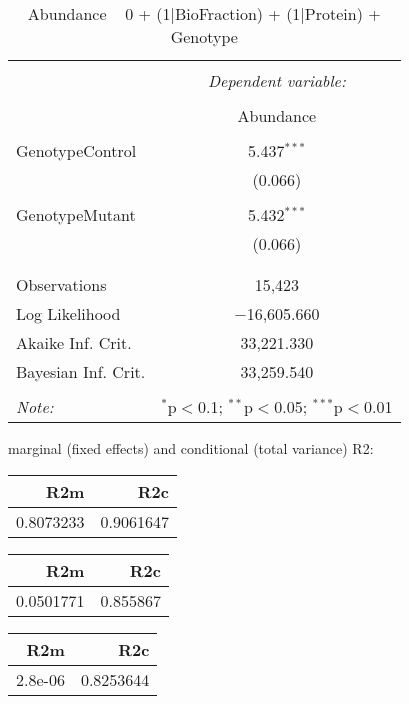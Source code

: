\documentclass[11pt]{report}
\begin{document}
\begin{table}[!htbp] \centering 
  \caption{Abundance ~ 0 + (1|BioFraction) + (1|Protein) + Genotype} 
  \label{} 
\begin{tabular}{@{\extracolsep{5pt}}lc} 
\\[-1.8ex]\hline 
\hline \\[-1.8ex] 
 & \multicolumn{1}{c}{\textit{Dependent variable:}} \\ 
\cline{2-2} 
\\[-1.8ex] & Abundance \\ 
\hline \\[-1.8ex] 
 GenotypeControl & 5.437$^{***}$ \\ 
  & (0.066) \\ 
  & \\ 
 GenotypeMutant & 5.432$^{***}$ \\ 
  & (0.066) \\ 
  & \\ 
\hline \\[-1.8ex] 
Observations & 15,423 \\ 
Log Likelihood & $-$16,605.660 \\ 
Akaike Inf. Crit. & 33,221.330 \\ 
Bayesian Inf. Crit. & 33,259.540 \\ 
\hline 
\hline \\[-1.8ex] 
\textit{Note:}  & \multicolumn{1}{r}{$^{*}$p$<$0.1; $^{**}$p$<$0.05; $^{***}$p$<$0.01} \\ 
\end{tabular} 
\end{table} 
marginal (fixed effects) and conditional (total variance) R2:

\begin{tabular}{r|r}
\hline
R2m & R2c\\
\hline
0.8073233 & 0.9061647\\
\hline
\end{tabular}

\begin{tabular}{r|r}
\hline
R2m & R2c\\
\hline
0.0501771 & 0.855867\\
\hline
\end{tabular}

\begin{tabular}{r|r}
\hline
R2m & R2c\\
\hline
2.8e-06 & 0.8253644\\
\hline
\end{tabular}
\end{document}
